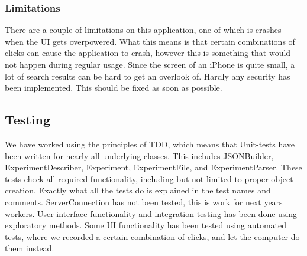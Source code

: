 \subsubsection{Limitations}

There are a couple of limitations on this application, one of which is crashes when the UI gets overpowered. What this means is that certain combinations of clicks can cause the application to crash, however this is something that would not happen during regular usage. Since the screen of an iPhone is quite small, a lot of search results can be hard to get an overlook of. Hardly any security has been implemented. This should be fixed as soon as possible.  
 
\subsection{Testing}

We have worked using the principles of TDD, which means that Unit-tests have been written for nearly all underlying classes. This includes JSONBuilder, ExperimentDescriber, Experiment, ExperimentFile, and ExperimentParser. These tests check all required functionality, including but not limited to proper object creation. Exactly what all the tests do is explained in the test names and comments. ServerConnection has not been tested, this is work for next years workers. User interface functionality and integration testing has been done using exploratory methods. Some UI functionality has been tested using automated tests, where we recorded a certain combination of clicks, and let the computer do them instead. 
